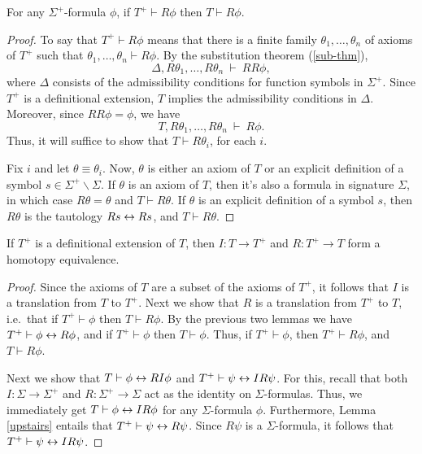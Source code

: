 \begin{lemma} For any $\Sigma ^+$-formula $\phi$, if $T^+\vdash R\phi$
  then $T\vdash R\phi$. \end{lemma}

\begin{proof} To say that $T^+\vdash R\phi$ means that there is a
  finite family $\theta _1,\dots ,\theta _n$ of axioms of $T^+$ such
  that $\theta _1,\dots ,\theta _n\vdash R\phi$.  By the substitution
  theorem (\ref{sub-thm}),
  \[ \Delta ,R\theta _1,\dots ,R\theta _n \:\vdash \: RR\phi ,\] where
  $\Delta$ consists of the admissibility conditions for function
  symbols in $\Sigma ^+$.  Since $T^+$ is a definitional extension,
  $T$ implies the admissibility conditions in $\Delta$.  Moreover,
  since $RR\phi = \phi$, we have
  \[ T,R\theta _1,\dots ,R\theta _n \:\vdash \: R\phi .\] Thus, it will
  suffice to show that $T\vdash R\theta _i$, for each $i$.

  Fix $i$ and let $\theta \equiv\theta _i$.  Now, $\theta$ is either
  an axiom of $T$ or an explicit definition of a symbol
  $s\in \Sigma ^+\backslash \Sigma$.  If $\theta$ is an axiom of $T$,
  then it's also a formula in signature $\Sigma$, in which case
  $R\theta =\theta$ and $T\vdash R\theta$.  If $\theta$ is an explicit
  definition of a symbol $s$, then $R\theta$ is the tautology
  $Rs\leftrightarrow Rs$, and $T\vdash R\theta$.  \end{proof}


\begin{prop} If $T^+$ is a definitional extension of $T$, then
  $I:T\to T^+$ and $R:T^+\to T$ form a homotopy
  equivalence.  \label{ex-eq} \end{prop}

\begin{proof} Since the axioms of $T$ are a subset of the axioms of
  $T^+$, it follows that $I$ is a translation from $T$ to $T^+$.  Next
  we show that $R$ is a translation from $T^+$ to $T$, i.e.\ that if
  $T^+\vdash \phi$ then $T\vdash R\phi$.  By the previous two lemmas
  we have $T^+\vdash \phi\leftrightarrow R\phi$, and if $T^+\vdash\phi$ then
  $T\vdash \phi$.  Thus, if $T^+\vdash \phi$, then $T^+\vdash R\phi$,
  and $T\vdash R\phi$.

  Next we show that $T\vdash \phi\leftrightarrow RI\phi$ and
  $T^+\vdash \psi\leftrightarrow IR\psi$.  For this, recall that both
  $I:\Sigma\to \Sigma ^+$ and $R:\Sigma ^+\to \Sigma$ act as the
  identity on $\Sigma$-formulas.  Thus, we immediately get
  $T\vdash \phi\leftrightarrow IR\phi$ for any $\Sigma$-formula $\phi$.
  Furthermore, Lemma \ref{upstairs} entails that
  $T^+\vdash \psi\leftrightarrow R\psi$.  Since $R\psi$ is a $\Sigma$-formula, it
  follows that $T^+\vdash \psi\leftrightarrow IR\psi$. \end{proof}

